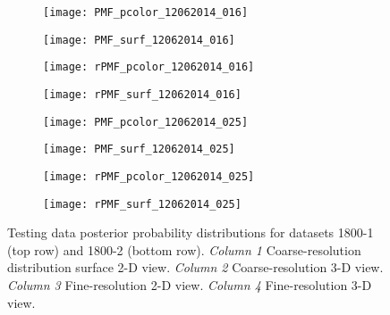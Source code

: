 \begin{figure} [h!]	
  	\centering
	\begin{subfigure}[b]{0.24\textwidth}
                \texttt{[image: PMF\_pcolor\_12062014\_016]}
		\caption{}
  	\end{subfigure}
  	\centering
	\begin{subfigure}[b]{0.24\textwidth}
                \texttt{[image: PMF\_surf\_12062014\_016]}
		\caption{}
  	\end{subfigure}
  	\centering
	\begin{subfigure}[b]{0.24\textwidth}
                \texttt{[image: rPMF\_pcolor\_12062014\_016]}
		\caption{}
  	\end{subfigure}
  	\centering
	\begin{subfigure}[b]{0.24\textwidth}
                \texttt{[image: rPMF\_surf\_12062014\_016]}
		\caption{}
  	\end{subfigure}
  		  	
  	\centering
	\begin{subfigure}[b]{0.24\textwidth}
                \texttt{[image: PMF\_pcolor\_12062014\_025]}
		\caption{}
  	\end{subfigure}
  	\centering
	\begin{subfigure}[b]{0.24\textwidth}
                \texttt{[image: PMF\_surf\_12062014\_025]}
		\caption{}
  	\end{subfigure}
  	\centering
	\begin{subfigure}[b]{0.24\textwidth}
                \texttt{[image: rPMF\_pcolor\_12062014\_025]}
		\caption{}
  	\end{subfigure}
  	\centering
	\begin{subfigure}[b]{0.24\textwidth}
                \texttt{[image: rPMF\_surf\_12062014\_025]}
		\caption{}
  	\end{subfigure}
  	
	\caption{Testing data posterior probability distributions for datasets 1800-1 (top row) and 1800-2 (bottom row). \emph{Column 1} Coarse-resolution distribution surface 2-D view. \emph{Column 2} Coarse-resolution 3-D view. \emph{Column 3} Fine-resolution 2-D view. \emph{Column 4} Fine-resolution 3-D view. }
	\label{fig:2850Distributions3}
\end{figure}


